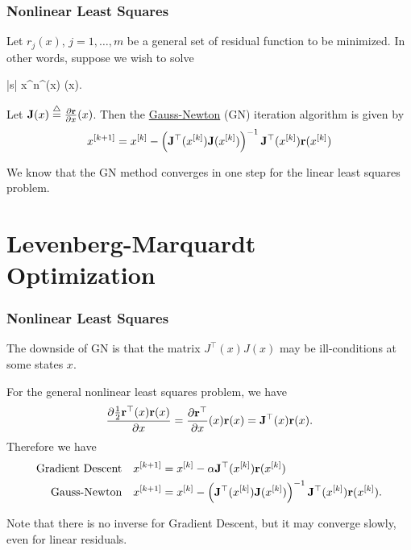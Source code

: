 \documentclass{beamer}
\begin{document}
\begin{frame}\frametitle{Nonlinear Least Squares}
	Let $r_j(x)$, $j=1, \dots, m$ be a general set of residual function to be minimized.  In other words, suppose we wish to solve
	\begin{mini*}|s|
		{x\in{}^n}{\rbf^\top(x) \rbf(x)}{}{}.
	\end{mini*}
	Let $\mathbf{J}(x) \stackrel{\triangle}{=} \frac{\partial \mathbf{r}}{\partial x}(x)$.  Then the \underline{Gauss-Newton} (GN) iteration algorithm is given by
	\[
		x^{[k+1]} = x^{[k]} - \left(\mathbf{J}^\top(x^{[k]}) \mathbf{J}(x^{[k]})\right)^{-1} \mathbf{J}^\top(x^{[k]}) \mathbf{r}(x^{[k]})
	\]
	
	We know that the GN method converges in one step for the linear least squares problem.
\end{frame}

\section{Levenberg-Marquardt Optimization}
\frame{\sectionpage}

\begin{frame}\frametitle{Nonlinear Least Squares}
	The downside of GN is that the matrix $J^\top(x) J(x)$ may be ill-conditions at some states $x$.
	
	For the general nonlinear least squares problem, we have
	\[
	\frac{\partial \frac{1}{2}\mathbf{r}^\top(x) \mathbf{r}(x)}{\partial x} = \frac{\partial \mathbf{r}^\top}{\partial x}(x) \mathbf{r}(x) = \mathbf{J}^\top(x)\mathbf{r}(x).
	\]
	Therefore we have
	\begin{align*}
		\text{Gradient Descent} &\quad 	x^{[k+1]} = x^{[k]} - \alpha \mathbf{J}^\top(x^{[k]}) \mathbf{r}(x^{[k]}) \\
		\text{Gauss-Newton} &\quad 	x^{[k+1]} = x^{[k]} - \left(\mathbf{J}^\top(x^{[k]}) \mathbf{J}(x^{[k]})\right)^{-1} \mathbf{J}^\top(x^{[k]}) \mathbf{r}(x^{[k]}).		
	\end{align*}
	
	Note that there is no inverse for Gradient Descent, but it may converge slowly, even for linear residuals.
\end{frame}
\end{document}
